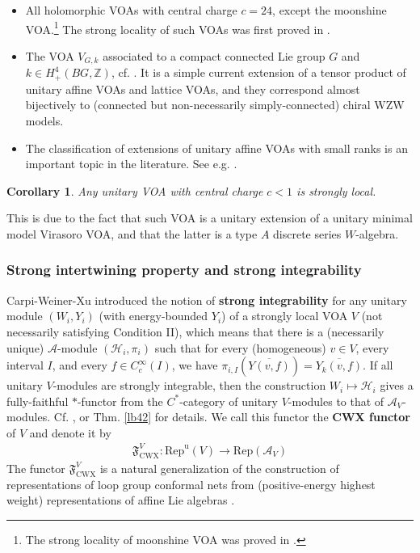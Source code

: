 \documentclass[11pt,b5paper,notitlepage]{article}
\theoremstyle{definition}
\theoremstyle{plain}
\newtheorem{co}[df]{Corollary}
\newcommand{\fk}{\mathfrak}
\newcommand{\mc}{\mathcal}
\newcommand{\ovl}{\overline}
\newcommand{\Rep}{\mathrm{Rep}}
\newcommand{\uni}{\mathrm{u}}
\newcommand{\RepV}{{\mathrm{Rep}^\uni(V)}}
\newcommand{\Zbb}{\mathbb Z}
\newcommand{\CWX}{{\scriptscriptstyle \mathrm{CWX}}}
\numberwithin{equation}{section}
\begin{document}
\begin{itemize}
\item All holomorphic VOAs with central charge $c=24$, except the moonshine VOA.\footnote{The strong locality of moonshine VOA was proved in \cite{CKLW18}.} The strong locality of such VOAs was first proved in \cite[Thm. 5.5]{CGGH23}. 
\item The VOA $V_{G,k}$ associated to a compact connected Lie group $G$ and $k\in H_+^4(BG,\Zbb)$, cf. \cite{Hen17}. It is a simple current extension of a tensor product of unitary affine VOAs and lattice VOAs, and they correspond almost bijectively to (connected but non-necessarily simply-connected) chiral WZW models.
\item The classification of extensions of unitary affine VOAs with small ranks is an important topic in the literature. See e.g. \cite{CIZ87,Gan94,KO02,EP09,EM23,Gan23}.
\end{itemize}

\begin{co}
Any unitary VOA with central charge $c<1$ is strongly local.
\end{co}
This is due to the fact that such VOA is a unitary extension of a unitary minimal model Virasoro VOA, and that the latter is a type $A$ discrete series $W$-algebra. 



\subsubsection{Strong intertwining property and strong integrability}

Carpi-Weiner-Xu introduced the notion of \textbf{strong integrability} for any unitary module $(W_i, Y_i)$ (with energy-bounded $Y_i$) of a strongly local VOA $V$ (not necessarily satisfying Condition II), which means that there is a (necessarily unique) $\mc A$-module $(\mc H_i,\pi_i)$ such that for every (homogeneous) $v\in V$, every interval $I$, and every $f\in C_c^\infty(I)$, we have $\pi_{i,I}(\ovl{Y(v,f)})=\ovl{Y_k(v,f)}$. If all unitary $V$-modules are strongly integrable, then the construction $W_i\mapsto\mc H_i$ gives a fully-faithful $*$-functor from the $C^*$-category of unitary $V$-modules to that of $\mc A_V$-modules. Cf. \cite{CWX,Gui19b}, or Thm. \ref{lb42} for details. We call this functor the \textbf{CWX functor} of $V$ and denote it by
\begin{align*}
\fk F^V_\CWX:\RepV\rightarrow\Rep(\mc A_V)
\end{align*}
The functor $\fk F_\CWX^V$ is a natural generalization of the construction of representations of loop group conformal nets from  (positive-energy highest weight) representations of affine Lie algebras \cite{GF93,Was98,TL04}.
\end{document}
